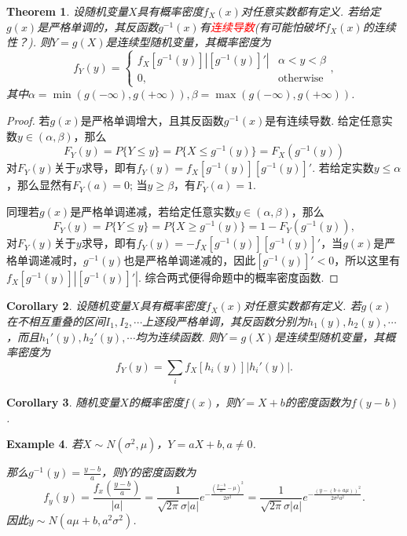 \documentclass{article}
\newtheorem{theorem}{Theorem}[section]
\newtheorem{corollary}[theorem]{Corollary}
\newtheorem{example}[theorem]{Example}
\newcommand{\redt}[1]{\textcolor{red}{#1}}
\begin{document}
\begin{theorem}
\rm 设随机变量$X$具有概率密度$f_X(x)$对任意实数都有定义. 若给定$g(x)$是严格单调的，其反函数$g^{-1}(x)$有\redt{连续导数}(有可能怕破坏$f_X(x)$的连续性？). 则$Y = g(X)$是连续型随机变量，其概率密度为
$$
f_Y(y) = \left\{ \begin{array}{ll}
f_X\left[ g^{-1}(y) \right]|\left[g^{-1}(y)\right]'| & \alpha < y < \beta \\
0 , & \text{otherwise}
\end{array}\right. ,
$$
其中$\alpha = \min(g(-\infty), g(+\infty)),\beta = \max(g(-\infty), g(+\infty))$. 
\end{theorem}

\begin{proof}
若$g(x)$是严格单调增大，且其反函数$g^{-1}(x)$是有连续导数. 给定任意实数$y \in (\alpha,\beta)$，那么
$$
F_Y(y) = P\{Y \leq y \} = P\{X \leq g^{-1}(y)\} = F_X(g^{-1}(y))
$$
对$F_Y(y)$关于$y$求导，即有$f_Y(y) = f_X\left[ g^{-1}(y) \right]\left[g^{-1}(y)\right]'$. 若给定实数$y \leq \alpha$，那么显然有$F_Y(a) = 0$; 当$y \geq \beta$，有$F_Y(a) = 1$.

同理若$g(x)$是严格单调递减，若给定任意实数$y \in (\alpha,\beta)$，那么
$$
F_Y(y) = P\{Y \leq y \} = P\{X \geq g^{-1}(y)\} = 1-F_Y(g^{-1}(y)), 
$$
对$F_Y(y)$关于$y$求导，即有$f_Y(y) = -f_X\left[ g^{-1}(y) \right]\left[g^{-1}(y)\right]'$，当$g(x)$是严格单调递减时，$g^{-1}(y)$也是严格单调递减的，因此$\left[g^{-1}(y)\right]' < 0$，所以这里有$f_X\left[ g^{-1}(y) \right]|\left[g^{-1}(y)\right]'|$. 综合两式便得命题中的概率密度函数. 
\end{proof}

\begin{corollary}
\rm 设随机变量$X$具有概率密度$f_X(x)$对任意实数都有定义. 若$g(x)$在不相互重叠的区间$I_1,I_2,\cdots$上逐段严格单调，其反函数分别为$h_1(y),h_2(y),\cdots$，而且$h_1'(y),h_2'(y),\cdots$均为连续函数. 则$Y=g(X)$是连续型随机变量，其概率密度为
$$
f_Y(y) = \sum\limits_{i}f_X\left[h_i(y)\right]|h_i'(y)|. 
$$
\end{corollary}

\begin{corollary}
\rm 随机变量$X$的概率密度$f(x)$，则$Y=X+b$的密度函数为$f(y-b)$.
\end{corollary}

\begin{example}
\rm 若$X \sim N(\sigma^2,\mu)$，$Y=aX+b,a\neq 0$. 

那么$g^{-1}(y) = \frac{y-b}{a}$，则$Y$的密度函数为
$$
f_y(y) = \frac{f_x(\frac{y-b}{a})}{|a|} = \frac{1}{\sqrt{2\pi}\sigma|a|}e^{-\frac{(\frac{y-b}{a}-\mu)^2}{2\sigma^2}} = \frac{1}{\sqrt{2\pi}\sigma|a|}e^{-\frac{(y-(b+a\mu))^2}{2\sigma^2a^2}}.
$$
因此$y \sim N(a\mu+b,a^2\sigma^2)$.
\end{example}
\end{document}
